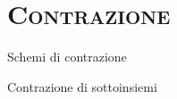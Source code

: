 \documentclass[xcolor=x11names,compress]{beamer}
\begin{document}
\section{\scshape Contrazione}
{
\begin{frame}[t]{Schemi di contrazione}
    \vspace{-0.5cm}
    
    
    
    
    
\end{frame}}

{
\begin{frame}[t]{Contrazione di sottoinsiemi}
    \vspace{-0.4725cm}
    
\end{frame}}
\end{document}
